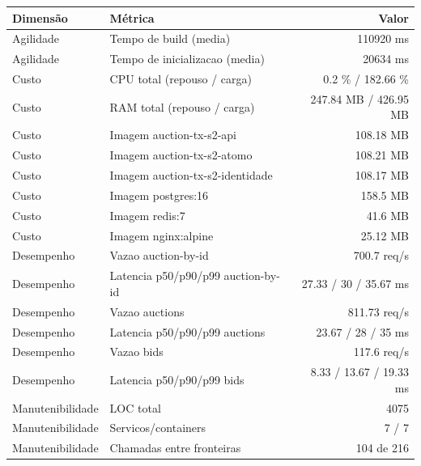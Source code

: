 \begin{quadro}[htb]
  \centering
  \caption{Métricas (auction, transacoes, snapshot-2).}
  \label{qua:metricas-auction-transacoes-snapshot-2}
  \renewcommand{\arraystretch}{1.15}
  \begin{tabular}{|l|l|r|}
    \hline
    \textbf{Dimensão} & \textbf{Métrica} & \textbf{Valor} \\
    \hline
    Agilidade & Tempo de build (media) & 110920 ms \\ \hline
    Agilidade & Tempo de inicializacao (media) & 20634 ms \\ \hline
    Custo & CPU total (repouso / carga) & 0.2 \% / 182.66 \% \\ \hline
    Custo & RAM total (repouso / carga) & 247.84 MB / 426.95 MB \\ \hline
    Custo & Imagem auction-tx-s2-api & 108.18 MB \\ \hline
    Custo & Imagem auction-tx-s2-atomo & 108.21 MB \\ \hline
    Custo & Imagem auction-tx-s2-identidade & 108.17 MB \\ \hline
    Custo & Imagem postgres:16 & 158.5 MB \\ \hline
    Custo & Imagem redis:7 & 41.6 MB \\ \hline
    Custo & Imagem nginx:alpine & 25.12 MB \\ \hline
    Desempenho & Vazao auction-by-id & 700.7 req/s \\ \hline
    Desempenho & Latencia p50/p90/p99 auction-by-id & 27.33 / 30 / 35.67 ms \\ \hline
    Desempenho & Vazao auctions & 811.73 req/s \\ \hline
    Desempenho & Latencia p50/p90/p99 auctions & 23.67 / 28 / 35 ms \\ \hline
    Desempenho & Vazao bids & 117.6 req/s \\ \hline
    Desempenho & Latencia p50/p90/p99 bids & 8.33 / 13.67 / 19.33 ms \\ \hline
    Manutenibilidade & LOC total & 4075 \\ \hline
    Manutenibilidade & Servicos/containers & 7 / 7 \\ \hline
    Manutenibilidade & Chamadas entre fronteiras & 104 de 216 \\ \hline
  \end{tabular}
\end{quadro}
